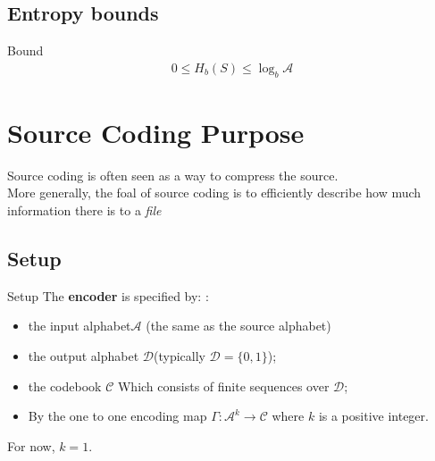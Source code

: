 \subsection{Entropy bounds}

\begin{parag}{Bound}
    \begin{align*}
        0 \leq H_b(S) \leq \log_b \mathcal{A}
    \end{align*}
    
\end{parag}

    \section{Source Coding Purpose}
    Source coding is often seen as a way to compress the source.
    \\
    More generally, the foal of source coding is to efficiently describe how much information there is to a \textit{file}
    
 \subsection{Setup}
 \begin{parag}{Setup}
     The \textbf{encoder} is specified by:
     : \
\begin{itemize}
    \item the input alphabet$ \mathcal{A}$ (the same as the source alphabet)
    \item the output alphabet $\mathcal{D} $(typically  $ \mathcal{D} = \{0, 1\}$);
    \item the codebook $\mathcal{C} $ Which consists of finite sequences over $ \mathcal{D}$;
    \item By the one to one encoding map $ \Gamma : \mathcal{A}^k \to \mathcal{C}$ where $k$ is a positive integer.
\end{itemize}
For now, $k = 1$.


 \end{parag}
 
